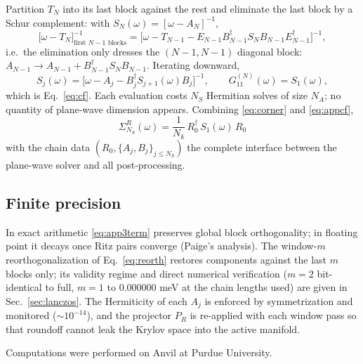 \documentclass[aps,prx,reprint,superscriptaddress,nofootinbib,longbibliography]{revtex4-2}
\begin{document}
Partition $T_N$ into its last block against the rest and eliminate the last
block by a Schur complement: with
$S_N(\omega)=[\omega-A_N]^{-1}$,
\begin{equation}
  \big[\omega-T_N\big]^{-1}_{\text{first }N-1\text{ blocks}}
  =\Big[\omega-T_{N-1}-E_{N-1}B_{N-1}^{\dagger}
  S_N B_{N-1}E_{N-1}^{\dagger}\Big]^{-1},
\end{equation}
i.e.\ the elimination only dresses the $(N{-}1,N{-}1)$ diagonal block:
$A_{N-1}\to A_{N-1}+B_{N-1}^{\dagger}S_N B_{N-1}$. Iterating downward,
\begin{equation}
  S_j(\omega)=\big[\omega-A_j-B_j^{\dagger}S_{j+1}(\omega)B_j\big]^{-1},
  \qquad
  G^{(N)}_{11}(\omega)=S_1(\omega),
  \label{eq:appcf}
\end{equation}
which is Eq.~\eqref{eq:cf}. Each evaluation costs $N_S$ Hermitian solves of
size $N_A$; no quantity of plane-wave dimension appears. Combining
\eqref{eq:corner} and \eqref{eq:appcf},
\begin{equation}
  \boxed{\;\Sigma^R_{N_S}(\omega)=\frac{1}{N_k}\,
  R_0^{\dagger}\,S_1(\omega)\,R_0\;}
\end{equation}
with the chain data $(R_0,\{A_j,B_j\}_{j\le N_S})$ the complete interface
between the plane-wave solver and all post-processing.

\subsection{Finite precision}

In exact arithmetic \eqref{eq:app3term} preserves global block
orthogonality; in floating point it decays once Ritz pairs converge
(Paige's analysis). The window-$m$ reorthogonalization of
Eq.~\eqref{eq:reorth} restores components against the last $m$ blocks only;
its validity regime and direct numerical verification ($m=2$ bit-identical
to full, $m=1$ to $0.000000$ meV at the chain lengths used) are given in
Sec.~\ref{sec:lanczos}. The Hermiticity of each $A_j$ is enforced by
symmetrization and monitored ($\sim10^{-14}$), and the projector $P_R$ is
re-applied with each window pass so that roundoff cannot leak the Krylov
space into the active manifold.

\begin{acknowledgments}
Computations were performed on Anvil at Purdue University.
\end{acknowledgments}
\end{document}
